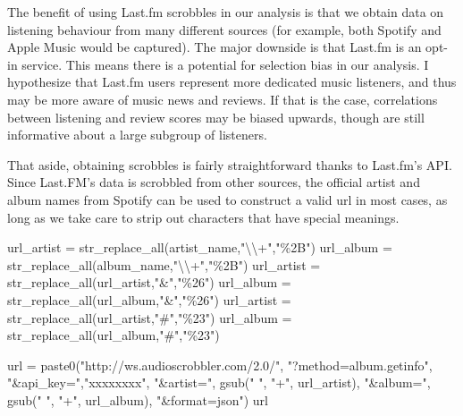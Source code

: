 \documentclass[
  11pt,
]{article}
\newenvironment{Shaded}{\begin{snugshade}}{\end{snugshade}}
\newcommand{\FunctionTok}[1]{\textcolor[rgb]{0.00,0.00,0.00}{#1}}
\newcommand{\NormalTok}[1]{#1}
\newcommand{\OtherTok}[1]{\textcolor[rgb]{0.56,0.35,0.01}{#1}}
\newcommand{\SpecialCharTok}[1]{\textcolor[rgb]{0.00,0.00,0.00}{#1}}
\newcommand{\StringTok}[1]{\textcolor[rgb]{0.31,0.60,0.02}{#1}}
\begin{document}
The benefit of using Last.fm scrobbles in our analysis is that we obtain
data on listening behaviour from many different sources (for example,
both Spotify and Apple Music would be captured). The major downside is
that Last.fm is an opt-in service. This means there is a potential for
selection bias in our analysis. I hypothesize that Last.fm users
represent more dedicated music listeners, and thus may be more aware of
music news and reviews. If that is the case, correlations between
listening and review scores may be biased upwards, though are still
informative about a large subgroup of listeners.

That aside, obtaining scrobbles is fairly straightforward thanks to
Last.fm's API. Since Last.FM's data is scrobbled from other sources, the
official artist and album names from Spotify can be used to construct a
valid url in most cases, as long as we take care to strip out characters
that have special meanings.

\begin{Shaded}
\begin{Highlighting}[]
\NormalTok{url\_artist }\OtherTok{=} \FunctionTok{str\_replace\_all}\NormalTok{(artist\_name,}\StringTok{"}\SpecialCharTok{\textbackslash{}\textbackslash{}}\StringTok{+"}\NormalTok{,}\StringTok{"\%2B"}\NormalTok{)}
\NormalTok{url\_album  }\OtherTok{=} \FunctionTok{str\_replace\_all}\NormalTok{(album\_name,}\StringTok{"}\SpecialCharTok{\textbackslash{}\textbackslash{}}\StringTok{+"}\NormalTok{,}\StringTok{"\%2B"}\NormalTok{)}
\NormalTok{url\_artist }\OtherTok{=} \FunctionTok{str\_replace\_all}\NormalTok{(url\_artist,}\StringTok{"\&"}\NormalTok{,}\StringTok{"\%26"}\NormalTok{)}
\NormalTok{url\_album  }\OtherTok{=} \FunctionTok{str\_replace\_all}\NormalTok{(url\_album,}\StringTok{"\&"}\NormalTok{,}\StringTok{"\%26"}\NormalTok{)}
\NormalTok{url\_artist }\OtherTok{=} \FunctionTok{str\_replace\_all}\NormalTok{(url\_artist,}\StringTok{"\#"}\NormalTok{,}\StringTok{"\%23"}\NormalTok{)}
\NormalTok{url\_album  }\OtherTok{=} \FunctionTok{str\_replace\_all}\NormalTok{(url\_album,}\StringTok{"\#"}\NormalTok{,}\StringTok{"\%23"}\NormalTok{)}

\NormalTok{url }\OtherTok{=} \FunctionTok{paste0}\NormalTok{(}\StringTok{"http://ws.audioscrobbler.com/2.0/"}\NormalTok{,}
             \StringTok{"?method=album.getinfo"}\NormalTok{,}
             \StringTok{"\&api\_key="}\NormalTok{,}\StringTok{"xxxxxxxx"}\NormalTok{,}
             \StringTok{"\&artist="}\NormalTok{, }\FunctionTok{gsub}\NormalTok{(}\StringTok{" "}\NormalTok{, }\StringTok{"+"}\NormalTok{, url\_artist),}
             \StringTok{"\&album="}\NormalTok{, }\FunctionTok{gsub}\NormalTok{(}\StringTok{" "}\NormalTok{, }\StringTok{"+"}\NormalTok{, url\_album),}
             \StringTok{"\&format=json"}\NormalTok{)}
\NormalTok{url}
\end{Highlighting}
\end{Shaded}
\end{document}
